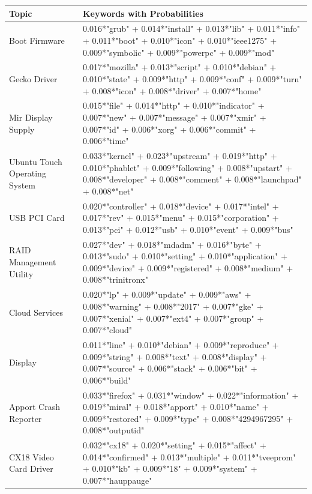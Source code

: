\documentclass[a4paper,12pt,twoside]{report}
\begin{document}
\begin{table} %
    \centering
    \begin{adjustbox}{max width=\columnwidth}
    \def\arraystretch{1} %
    \begin{tabular}{p{3cm} p{12cm}}
        \toprule
        \textbf{Topic} & \textbf{Keywords with Probabilities}\\
        \midrule
			Boot Firmware & 0.016*"grub" + 0.014*"install" + 0.013*"lib" + 0.011*"info" + 0.011*"boot" + 0.010*"icon" + 0.010*"ieee1275" + 0.009*"symbolic" + 0.009*"powerpc" + 0.009*"mod" \\
			\midrule 
			Gecko Driver & 0.017*"mozilla" + 0.013*"script" + 0.010*"debian" + 0.010*"state" + 0.009*"http" + 0.009*"conf" + 0.009*"turn" + 0.008*"icon" + 0.008*"driver" + 0.007*"home" \\ 
			\midrule 
			Mir Display Supply & 0.015*"file" + 0.014*"http" + 0.010*"indicator" + 0.007*"new" + 0.007*"message" + 0.007*"xmir" + 0.007*"id" + 0.006*"xorg" + 0.006*"commit" + 0.006*"time" \\
			\midrule 
			Ubuntu Touch Operating System & 0.033*"kernel" + 0.023*"upstream" + 0.019*"http" + 0.010*"phablet" + 0.009*"following" + 0.008*"upstart" + 0.008*"developer" + 0.008*"comment" + 0.008*"launchpad" + 0.008*"net" \\
			\midrule 
			USB PCI Card & 0.020*"controller" + 0.018*"device" + 0.017*"intel" + 0.017*"rev" + 0.015*"menu" + 0.015*"corporation" + 0.013*"pci" + 0.012*"usb" + 0.010*"event" + 0.009*"bus" \\
			\midrule 
			RAID Management Utility & 0.027*"dev" + 0.018*"mdadm" + 0.016*"byte" + 0.013*"sudo" + 0.010*"setting" + 0.010*"application" + 0.009*"device" + 0.009*"registered" + 0.008*"medium" + 0.008*"trinitronx" \\
			\midrule 
			Cloud Services & 0.020*"lp" + 0.009*"update" + 0.009*"aws" + 0.008*"warning" + 0.008*"2017" + 0.007*"gke" + 0.007*"xenial" + 0.007*"ext4" + 0.007*"group" + 0.007*"cloud" \\
			\midrule 
			Display & 0.011*"line" + 0.010*"debian" + 0.009*"reproduce" + 0.009*"string" + 0.008*"text" + 0.008*"display" + 0.007*"source" + 0.006*"stack" + 0.006*"bit" + 0.006*"build" \\
			\midrule 
			Apport Crash Reporter & 0.033*"firefox" + 0.031*"window" + 0.022*"information" + 0.019*"miral" + 0.018*"apport" + 0.010*"name" + 0.009*"restored" + 0.009*"type" + 0.008*"4294967295" + 0.008*"outputid" \\
			\midrule 
			CX18 Video Card Driver & 0.032*"cx18" + 0.020*"setting" + 0.015*"affect" + 0.014*"confirmed" + 0.013*"multiple" + 0.011*"tveeprom" + 0.010*"kb" + 0.009*"18" + 0.009*"system" + 0.007*"hauppauge" \\
        \midrule
    \end{tabular}
    \end{adjustbox}
    \label{tab:tmUbuntu}
\end{table} 
\end{document}
